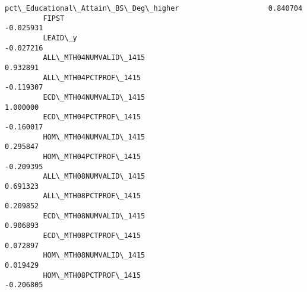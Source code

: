 \documentclass[11pt]{article}
\begin{document}
\begin{Verbatim}[commandchars=\\\{\}]
         pct\_Educational\_Attain\_BS\_Deg\_higher                     0.840704   
         FIPST                                                   -0.025931   
         LEAID\_y                                                 -0.027216   
         ALL\_MTH04NUMVALID\_1415                                   0.932891   
         ALL\_MTH04PCTPROF\_1415                                   -0.119307   
         ECD\_MTH04NUMVALID\_1415                                   1.000000   
         ECD\_MTH04PCTPROF\_1415                                   -0.160017   
         HOM\_MTH04NUMVALID\_1415                                   0.295847   
         HOM\_MTH04PCTPROF\_1415                                   -0.209395   
         ALL\_MTH08NUMVALID\_1415                                   0.691323   
         ALL\_MTH08PCTPROF\_1415                                    0.209852   
         ECD\_MTH08NUMVALID\_1415                                   0.906893   
         ECD\_MTH08PCTPROF\_1415                                    0.072897   
         HOM\_MTH08NUMVALID\_1415                                   0.019429   
         HOM\_MTH08PCTPROF\_1415                                   -0.206805   
         

\end{Verbatim}
\end{document}
